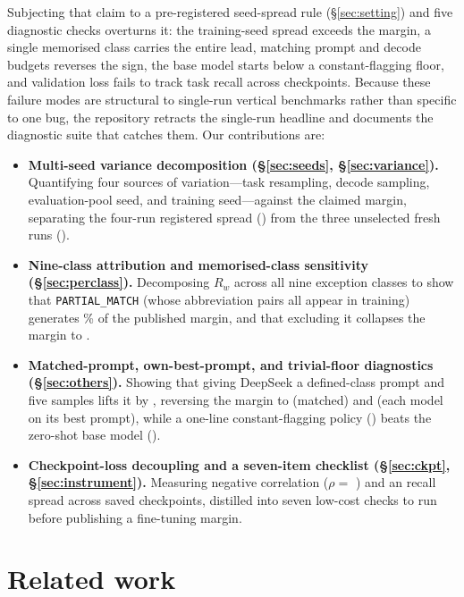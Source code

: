 \documentclass[11pt]{article}
\begin{document}
Subjecting that claim to a pre-registered seed-spread rule (\S\ref{sec:setting}) and five diagnostic checks overturns it: the training-seed spread exceeds the margin, a single memorised class carries the entire lead, matching prompt and decode budgets reverses the sign, the base model starts below a constant-flagging floor, and validation loss fails to track task recall across checkpoints. Because these failure modes are structural to single-run vertical benchmarks rather than specific to one bug, the repository retracts the single-run headline and documents the diagnostic suite that catches them. Our contributions are:
\begin{itemize}\setlength\itemsep{1pt}\setlength\parskip{0pt}
\item \textbf{Multi-seed variance decomposition (\S\ref{sec:seeds}, \S\ref{sec:variance}).} Quantifying four sources of variation---task resampling, decode sampling, evaluation-pool seed, and training seed---against the claimed \margin{} margin, separating the four-run registered spread (\rwSD{}) from the three unselected fresh runs (\rwFreshSD{}).
\item \textbf{Nine-class attribution and memorised-class sensitivity (\S\ref{sec:perclass}).} Decomposing $R_w$ across all nine exception classes to show that \texttt{PARTIAL\_MATCH} (whose \pmPairs{} abbreviation pairs all appear in training) generates \partialShare{}\% of the published margin, and that excluding it collapses the margin to \noPmPub{}.
\item \textbf{Matched-prompt, own-best-prompt, and trivial-floor diagnostics (\S\ref{sec:others}).} Showing that giving DeepSeek a defined-class prompt and five samples lifts it by \combEffect{}, reversing the margin to \matMargin{} (matched) and \bestPrompt{} (each model on its best prompt), while a one-line constant-flagging policy (\floorRw{}) beats the zero-shot base model (\rwBase{}).
\item \textbf{Checkpoint-loss decoupling and a seven-item checklist (\S\ref{sec:ckpt}, \S\ref{sec:instrument}).} Measuring negative correlation ($\rho = $ \ckptRho{}) and an \ckptSpread{} recall spread across \nCkpt{} saved checkpoints, distilled into seven low-cost checks to run before publishing a fine-tuning margin.
\end{itemize}

\section{Related work}
\label{sec:related}
\end{document}
